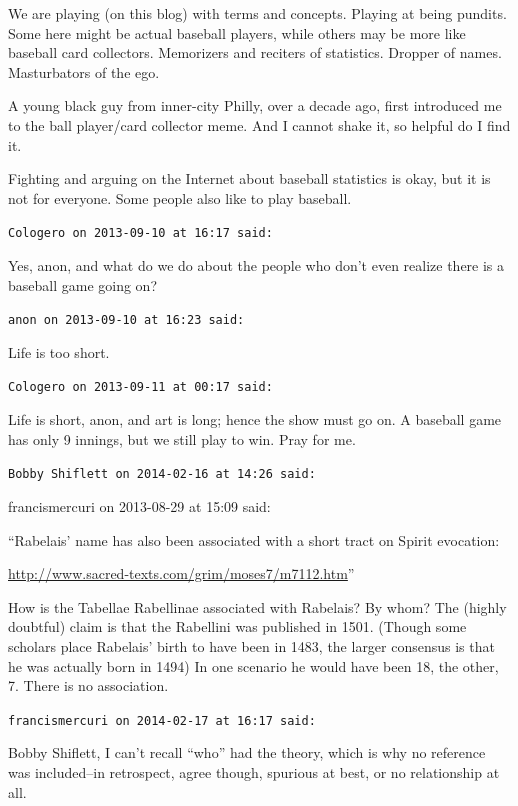 \begin{footnotesize}
\begin{sffamily}
We are playing (on this blog) with terms and concepts. Playing at being pundits. Some here might be actual baseball players, while others may be more like baseball card collectors. Memorizers and reciters of statistics. Dropper of names. Masturbators of the ego.

A young black guy from inner-city Philly, over a decade ago, first introduced me to the ball player/card collector meme. And I cannot shake it, so helpful do I find it.

Fighting and arguing on the Internet about baseball statistics is okay, but it is not for everyone. Some people also like to play baseball.

\hfill

\texttt{Cologero on 2013-09-10 at 16:17 said:}

Yes, anon, and what do we do about the people who don't even realize there is a baseball game going on?

\hfill

\texttt{anon on 2013-09-10 at 16:23 said:}

Life is too short.

\hfill

\texttt{Cologero on 2013-09-11 at 00:17 said:}

Life is short, anon, and art is long; hence the show must go on. A baseball game has only 9 innings, but we still play to win. Pray for me.

\hfill

\texttt{Bobby Shiflett on 2014-02-16 at 14:26 said:}

francismercuri on 2013-08-29 at 15:09 said:

``Rabelais' name has also been associated with a short tract on Spirit evocation:

\url{http://www.sacred-texts.com/grim/moses7/m7112.htm}''


How is the Tabellae Rabellinae associated with Rabelais? By whom? The (highly doubtful) claim is that the Rabellini was published in 1501. (Though some scholars place Rabelais' birth to have been in 1483, the larger consensus is that he was actually born in 1494) In one scenario he would have been 18, the other, 7. There is no association.

\hfill

\texttt{francismercuri on 2014-02-17 at 16:17 said:}

Bobby Shiflett, I can't recall ``who'' had the theory, which is why no reference was included--in retrospect, agree though, spurious at best, or no relationship at all.


\end{sffamily}
\end{footnotesize}

